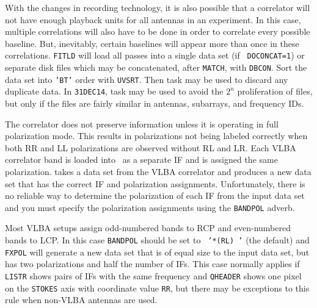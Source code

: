 With the changes in recording technology, it is also possible that a
correlator will not have enough playback units for all antennas in an
experiment.  In this case, multiple correlations will also have to be
done in order to correlate every possible baseline.  But, inevitably,
certain baselines will appear more than once in these correlations.
{\tt FITLD} will load all passes into a single data set (if {\tt
DOCONCAT=1}) or separate disk files which may be concatenated, after
{\tt MATCH}, with {\tt DBCON}\@.  Sort the data set into {\tt 'BT'}
order with {\tt UVSRT}\@.  Then task {\tt {}} may be used to
discard any duplicate data.  In {\tt 31DEC14}, task {\tt {}}
may be used to avoid the $2^n$ proliferation of files, but only if the
files are fairly similar in antennas, subarrays, and frequency IDs.



The  correlator does not preserve 
information unless it is operating in full polarization mode.  This
results in polarizations not being labeled correctly when both RR and
LL polarizations are observed without RL and LR\@.  Each VLBA
correlator band is loaded into \AIPS\ as a separate IF and is
assigned the same polarization.  {\tt {}} takes a data set
from the VLBA correlator and produces a new data set that has the
correct IF and polarization assignments.  Unfortunately, there is no
reliable way to determine the polarization of each IF from the input
data set  and you must specify the polarization assignments using the
{\tt BANDPOL} adverb.

Most VLBA setups assign odd-numbered bands to RCP and even-numbered
bands to LCP\@.  In this case {\tt BANDPOL} should be set to {\tt
'*(RL) '} (the default) and {\tt FXPOL} will generate a new data set
that is of equal size to the input data set, but has two polarizations
and half the number of IFs.  This case normally applies if {\tt LISTR}
shows pairs of IFs with the same frequency and {\tt QHEADER} shows one
pixel on the {\tt STOKES} axis with coordinate value {\tt RR}, but
there may be exceptions to this rule when non-VLBA antennas are used.

